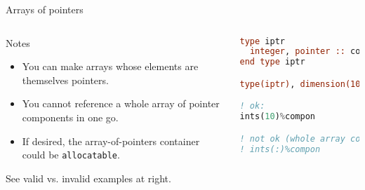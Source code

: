 %



\begin{frame}[fragile]{Arrays of pointers}
  \begin{columns}[T]
    \begin{block}{Notes}
      \begin{itemize}
        \item You can make arrays whose elements are themselves pointers.
        \item You cannot reference a whole array of pointer components in one go.
        \item If desired, the array-of-pointers container could be \texttt{allocatable}.
      \end{itemize}
      See valid vs. invalid examples at right.
    \end{block}

\begin{lstlisting}[language=Fortran]
type iptr
  integer, pointer :: compon
end type iptr

type(iptr), dimension(100) :: ints

! ok:
ints(10)%compon

! not ok (whole array component):
! ints(:)%compon
\end{lstlisting}
  \end{columns}
\end{frame}






